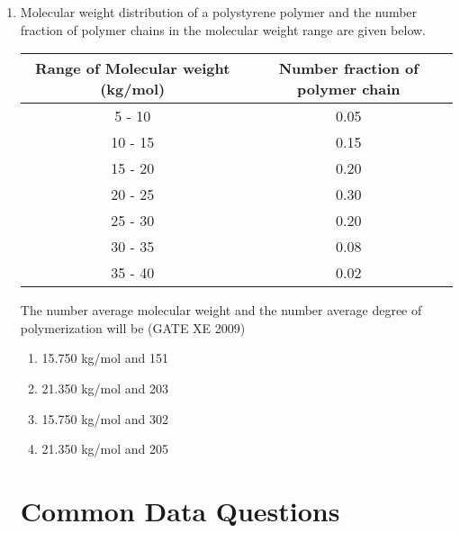 \documentclass[journal]{IEEEtran}
\begin{document}
\begin{enumerate}
    \begin{multicols}{4}
        \begin{enumerate}
            \item $\sim 506 \ \text{K}$
            \item $\sim 606 \ \text{K}$
            \item $\sim 726 \ \text{K}$
            \item $\sim 816 \ \text{K}$
        \end{enumerate}
    \end{multicols}

    \item Molecular weight distribution of a polystyrene polymer and the number fraction of polymer chains in the molecular weight range are given below.

    \begin{table}[h!]
    \centering
    \begin{tabular}{|c|c|}
    \hline
    \textbf{Range of Molecular weight (kg/mol)} & \textbf{Number fraction of polymer chain} \\ \hline
    5 - 10   & 0.05 \\ \hline
    10 - 15  & 0.15 \\ \hline
    15 - 20  & 0.20 \\ \hline
    20 - 25  & 0.30 \\ \hline
    25 - 30  & 0.20 \\ \hline
    30 - 35  & 0.08 \\ \hline
    35 - 40  & 0.02 \\ \hline
    \end{tabular}
    \end{table}

    The number average molecular weight and the number average degree of polymerization will be \hfill (GATE XE 2009)

    \begin{multicols}{2}
        \begin{enumerate}
            \item 15.750 kg/mol and 151
            \item 21.350 kg/mol and 203
            \item 15.750 kg/mol and 302
            \item 21.350 kg/mol and 205
        \end{enumerate}
    \end{multicols}

    \section*{Common Data Questions}


\end{enumerate}
\end{document}
